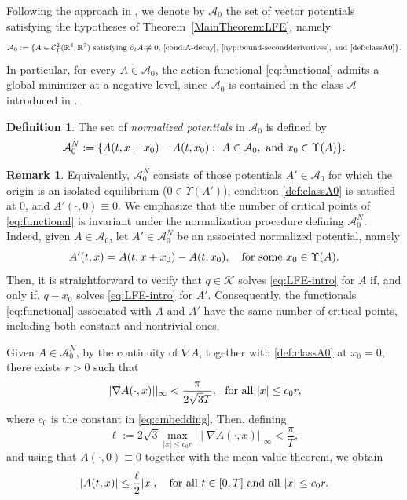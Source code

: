 \documentclass{article}
\newcommand{\boC}{\mathcal{C}}
\newcommand{\boK}{\mathcal{K}}
\newcommand{\R}{\mathbb{R}}
\newcommand{\boA}{\mathcal{A}}
\theoremstyle{definition}
\newtheorem{remark}{Remark}[section]
\newtheorem{definition}{Definition}[section]
\begin{document}
	Following the approach in \cite{GLM}, we denote by $\boA_0$ the set of vector potentials satisfying the hypotheses of Theorem~\ref{MainTheorem:LFE}, namely
	\begin{equation}\label{def:FamilyA0}
		\boA_0:=\{A\in\boC_T^2(\R^4;\R^3) \hbox{ satisfying $\partial_t A\not\equiv 0$, \eqref{cond:A-decay}, \eqref{hyp:bound-secondderivatives}, and \eqref{def:classA0}}\}.
	\end{equation}
	In particular, for every $A\in\boA_0$, the action functional \eqref{eq:functional} admits a global minimizer at a negative level, since $\boA_0$ is contained in the class $\boA$ introduced in \cite[Theorem 2.1]{GLM}.
	
	\begin{definition}
		The set of \textsl{normalized potentials} in $\boA_0$ is defined by
		\begin{equation}
			\boA_0^N:=\{A(t,x+x_0)-A(t,x_0):\ A\in\boA_0, \hbox{ and
			}  x_0\in\Upsilon(A)\}.
		\end{equation}
	\end{definition}
	\begin{remark}\label{rem:equivalenceCP}
		Equivalently, $\boA_0^N$ consists of those potentials $A'\in\boA_0$ for which the origin is an isolated equilibrium ($0\in\Upsilon(A')$), condition \eqref{def:classA0} is satisfied at $0$, and $A'(\cdot,0)\equiv0$. We emphasize that the number of critical points of \eqref{eq:functional} is invariant under the normalization procedure defining $\boA_0^N$. Indeed, given $A\in\boA_0$, let $A'\in\boA_0^N$ be an associated normalized potential, namely
		\begin{equation}
			A'(t,x)=A(t,x+x_0)-A(t,x_0),\quad\hbox{for some }x_0\in\Upsilon(A).
		\end{equation}
		Then, it is straightforward to verify that $q\in\boK$ solves \eqref{eq:LFE-intro} for $A$ if, and only if, $q-x_0$ solves \eqref{eq:LFE-intro} for $A'$. Consequently, the functionals \eqref{eq:functional} associated with $A$ and $A'$ have the same number of critical points, including both constant and nontrivial ones.
	\end{remark}
	
	Given $A\in\boA_0^N$, by the continuity of $\nabla A$, together with \eqref{def:classA0} at $x_0=0$, there exists $r>0$ such that
	\begin{equation}\label{def:r}
		\|\nabla A(\cdot,x)||_{\infty}<\frac{\pi}{2\sqrt{3}T},\ \hbox{ for all }|x|\leq c_0 r,
	\end{equation}
	where $c_0$ is the constant in \eqref{eq:embedding}. Then, defining
    $$
	\ell:=2\sqrt{3}\max_{|x|\leq c_0r}\|\nabla A(\cdot,x)||_{\infty}<\frac{\pi}{T},$$
    and using that $A(\cdot,0)\equiv0$ together with the mean value theorem, we obtain 
	\begin{equation}\label{hyp:linear}
		|A(t,x)|\leq \frac{\ell}{2}|x|,\quad\text{for all }t\in[0,T] \hbox{ and all }|x|\leq c_0r.
	\end{equation}
	
\end{document}
